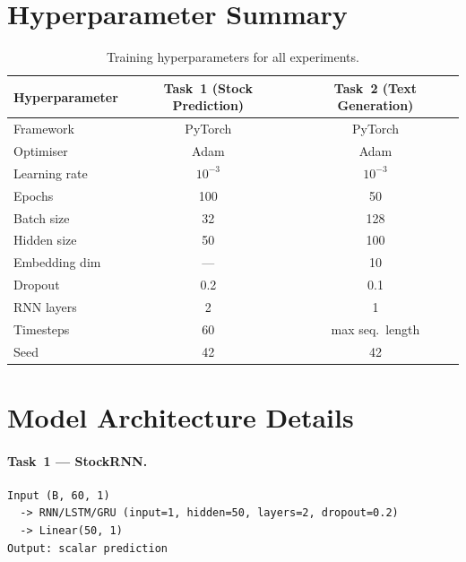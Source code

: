 \documentclass[11pt,letterpaper]{article}
\begin{document}
\appendix

\section{Hyperparameter Summary}

\begin{table}[H]
  \centering
  \caption{Training hyperparameters for all experiments.}
  \label{tab:hyperparams}
  \begin{tabular}{lcc}
    \toprule
    \textbf{Hyperparameter} &
    \textbf{Task~1 (Stock Prediction)} &
    \textbf{Task~2 (Text Generation)} \\
    \midrule
    Framework      & PyTorch        & PyTorch \\
    Optimiser      & Adam           & Adam \\
    Learning rate  & $10^{-3}$      & $10^{-3}$ \\
    Epochs         & 100            & 50 \\
    Batch size     & 32             & 128 \\
    Hidden size    & 50             & 100 \\
    Embedding dim  & ---            & 10 \\
    Dropout        & 0.2            & 0.1 \\
    RNN layers     & 2              & 1 \\
    Timesteps      & 60             & max seq.\ length \\
    Seed           & 42             & 42 \\
    \bottomrule
  \end{tabular}
\end{table}

\section{Model Architecture Details}

\paragraph{Task~1 --- StockRNN.}
\begin{verbatim}
Input (B, 60, 1)
  -> RNN/LSTM/GRU (input=1, hidden=50, layers=2, dropout=0.2)
  -> Linear(50, 1)
Output: scalar prediction
\end{verbatim}
\end{document}
